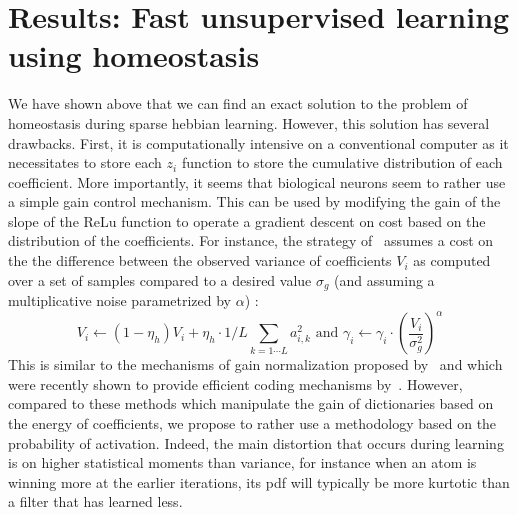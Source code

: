 \documentclass[a4paper, 11pt, draft]{article} %
\newcommand{\seeFig}[1]{Figure~\ref{fig:#1}}%
\begin{document}
\section{Results: Fast unsupervised learning using homeostasis}\label{results}
We have shown above that we can find an exact solution to the problem of homeostasis during sparse hebbian learning. However, this solution has several drawbacks. First, it is computationally intensive on a conventional computer as it necessitates to store each $z_i$ function to store the cumulative distribution of each coefficient. More importantly, it seems that biological neurons seem to rather use a simple gain control mechanism. This can be used by modifying the gain of the slope of the ReLu function to operate a gradient descent on cost based on the distribution of the coefficients. For instance, the strategy of~\citep{Olshausen97} assumes a cost on the the difference between the observed variance of coefficients $V_i$ as computed over a set of samples compared to a desired value $\sigma_g$ (and assuming a multiplicative noise parametrized by $\alpha$) :
\begin{equation}%
V_i \leftarrow (1- \eta_h ) V_i + \eta_h \cdot 1/L\sum_{k=1\cdots L} a_{i, k}^2 \textrm{ and }
\gamma_i \leftarrow \gamma_i \cdot \left( \frac{V_i}{\sigma_g^2} \right)^\alpha
\end{equation}%
This is similar to the mechanisms of gain normalization proposed by~\citep{Schwartz01} and which were recently shown to provide efficient coding mechanisms by~\citep{Simoncelli}. However, compared to these methods which manipulate the gain of dictionaries based on the energy of coefficients, we propose to rather use a methodology based on the probability of activation. Indeed, the main distortion that occurs during learning is on higher statistical moments than variance, for instance when an atom is winning more at the earlier iterations, its pdf will typically be more kurtotic than a filter that has learned less.
\end{document}
